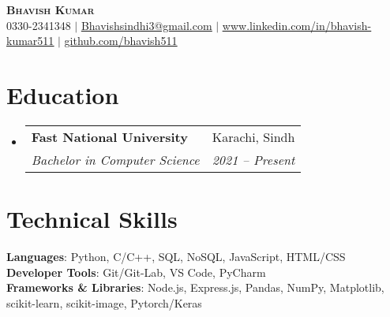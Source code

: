 \documentclass[letterpaper,11pt]{article}
\makeatletter
\newcommand{\resumeSubheading}[4]{
  \vspace{-2pt}\item
    \begin{tabular*}{0.97\textwidth}[t]{l@{\extracolsep{\fill}}r}
      \textbf{#1} & #2 \\
      \textit{\small#3} & \textit{\small #4} \\
    \end{tabular*}\vspace{-7pt}
}
\newcommand{\resumeSubHeadingListStart}{\begin{itemize}[leftmargin=0.15in, label={}]}
\newcommand{\resumeSubHeadingListEnd}{\end{itemize}}
\makeatother
\begin{document}
\begin{center}
    \textbf{\Huge \scshape Bhavish Kumar} \\ \vspace{1pt}
    \small 0330-2341348 $|$ \href{mailto:Bhavishsindhi3@gmail.com}{\underline{Bhavishsindhi3@gmail.com}} $|$ 
    \href{https://www.linkedin.com/in/bhavish-kumar511}{\underline{www.linkedin.com/in/bhavish-kumar511}} $|$
    \href{https://github.com/bhavish511}{\underline{github.com/bhavish511}}
\end{center}

\section{Education}
  \resumeSubHeadingListStart
    \resumeSubheading
      {Fast National University}{Karachi, Sindh}
      {Bachelor in Computer Science }{2021 -- Present}
  \resumeSubHeadingListEnd
  
\section{Technical Skills}
 \begin{itemize}[leftmargin=0.15in, label={}]
    \small{\item{
     \textbf{Languages}{: Python, C/C++, SQL, NoSQL, JavaScript, HTML/CSS} \\
     \textbf{Developer Tools}{: Git/Git-Lab, VS Code, PyCharm} \\
     \textbf{Frameworks \& Libraries}{: Node.js, Express.js, Pandas, NumPy, Matplotlib, scikit-learn, scikit-image, Pytorch/Keras}
    }}
 \end{itemize}

\end{document}
